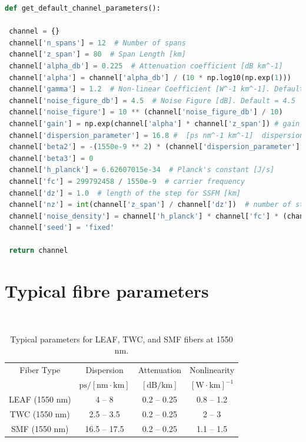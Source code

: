 \begin{lstlisting}[language=Python, caption=Default channel parameters, label=lst:default_channel_param]
def get_default_channel_parameters():

 channel = {}
 channel['n_spans'] = 12  # Number of spans
 channel['z_span'] = 80  # Span Length [km]
 channel['alpha_db'] = 0.225  # Attenuation coefficient [dB km^-1]
 channel['alpha'] = channel['alpha_db'] / (10 * np.log10(np.exp(1)))
 channel['gamma'] = 1.2  # Non-linear Coefficient [W^-1 km^-1]. Default = 1.2
 channel['noise_figure_db'] = 4.5  # Noise Figure [dB]. Default = 4.5
 channel['noise_figure'] = 10 ** (channel['noise_figure_db'] / 10)
 channel['gain'] = np.exp(channel['alpha'] * channel['z_span']) # gain for one span
 channel['dispersion_parameter'] = 16.8 #  [ps nm^-1 km^-1]  dispersion parameter
 channel['beta2'] = -(1550e-9 ** 2) * (channel['dispersion_parameter'] * 1e-3) / (2 * np.pi * 3e8)  # conversion to beta2 - Chromatic Dispersion Coefficient [s^2 km^-1]
 channel['beta3'] = 0
 channel['h_planck'] = 6.62607015e-34  # Planck's constant [J/s]
 channel['fc'] = 299792458 / 1550e-9  # carrier frequency
 channel['dz'] = 1.0  # length of the step for SSFM [km]
 channel['nz'] = int(channel['z_span'] / channel['dz'])  # number of steps per each span
 channel['noise_density'] = channel['h_planck'] * channel['fc'] * (channel['gain'] - 1) * channel['noise_figure']
 channel['seed'] = 'fixed'

 return channel
\end{lstlisting}

\section{Typical fibre parameters}\

\begin{table}[h!]
\caption{Typical parameters for LEAF, TWC, and SMF fibers at 1550 nm.}
\begin{center}
    \begin{tabular}{cccc}
    \hline
    Fiber Type & Dispersion & Attenuation & Nonlinearity \\
    & $\textrm{ps}/[\textrm{nm} \cdot \textrm{km}]$ & $[\textrm{dB}/\textrm{km}]$ & $[\textrm{W} \cdot \textrm{km}]^{-1}$ \\
    \hline
    LEAF (1550 nm) & 4 -- 8 & 0.2 -- 0.25 & 0.8 -- 1.2 \\
    TWC (1550 nm)& 2.5 -- 3.5 & 0.2 -- 0.25 & 2 -- 3 \\
    SMF (1550 nm) & 16.5 -- 17.5 & 0.2 -- 0.25 & 1.1 -- 1.5 \\
    \hline
    \end{tabular}
\end{center}
\label{tab:fibre_parameters}
\end{table}

